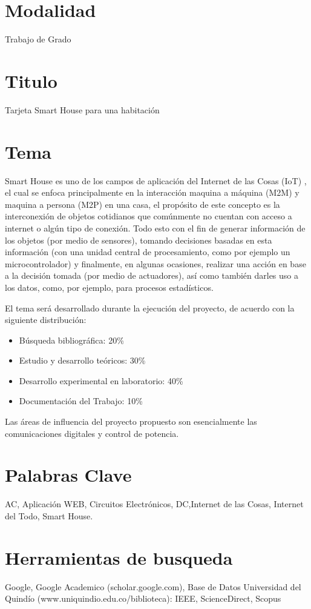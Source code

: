 	\section{Modalidad}
	Trabajo de Grado
	\section{Titulo}
	Tarjeta Smart House para una habitación
	\section{Tema}
	Smart House es uno de los campos de aplicación del Internet de las Cosas (IoT) \cite{IdT}, el cual se enfoca principalmente en la interacción maquina a máquina (M2M) y maquina a persona (M2P) en una casa, el propósito de este concepto es la interconexión de objetos cotidianos que comúnmente no cuentan con acceso a internet o algún tipo de conexión. Todo esto con el fin de generar información de los objetos (por medio de sensores), tomando decisiones basadas en esta información (con una unidad central de procesamiento, como por ejemplo un microcontrolador) y finalmente, en algunas ocasiones, realizar una acción en base a la decisión tomada (por medio de actuadores), así como también darles uso a los datos, como, por ejemplo, para procesos estadísticos.  
	
	El tema será desarrollado durante la ejecución del proyecto, de acuerdo con la siguiente distribución:
	\begin{itemize}
		\item Búsqueda bibliográfica:			20\%
		\item Estudio y desarrollo teóricos:		30\%
		\item Desarrollo experimental en laboratorio:	40\%
		\item Documentación del Trabajo:		10\%
	\end{itemize}
	Las áreas de influencia del proyecto propuesto son esencialmente las comunicaciones digitales y control de potencia. \\
	
	\section{Palabras Clave}
	
	AC, Aplicación WEB, Circuitos Electrónicos, DC,Internet de las Cosas, Internet del Todo, Smart House.
	
	\section{Herramientas de busqueda}
	
	Google, Google Academico (scholar.google.com), Base de Datos Universidad del Quindío (www.uniquindio.edu.co/biblioteca): IEEE, ScienceDirect, Scopus